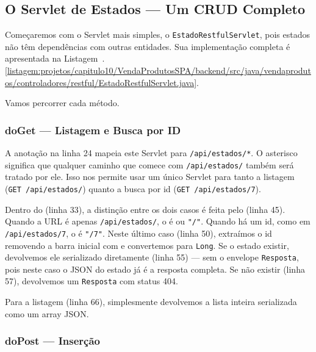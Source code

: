 \subsection{O Servlet de Estados --- Um CRUD Completo}

Começaremos com o Servlet mais simples, o \texttt{EstadoRestfulServlet}, pois estados não têm dependências com outras entidades. Sua implementação completa é apresentada na Listagem~\thechapter.\ref{listagem:projetos/capitulo10/VendaProdutosSPA/backend/src/java/vendaprodutos/controladores/restful/EstadoRestfulServlet.java}.


Vamos percorrer cada método.

\subsubsection{doGet --- Listagem e Busca por ID}

A anotação  na linha 24 mapeia este Servlet para \texttt{/api/estados/*}. O asterisco significa que qualquer caminho que comece com \texttt{/api/estados/} também será tratado por ele. Isso nos permite usar um único Servlet para tanto a listagem (\texttt{GET /api/estados/}) quanto a busca por id (\texttt{GET /api/estados/7}).

Dentro do  (linha 33), a distinção entre os dois casos é feita pelo  (linha 45). Quando a URL é apenas \texttt{/api/estados/}, o  é  ou \texttt{"/"}. Quando há um id, como em \texttt{/api/estados/7}, o  é \texttt{"/7"}. Neste último caso (linha 50), extraímos o id removendo a barra inicial com  e convertemos para \texttt{Long}. Se o estado existir, devolvemos ele serializado diretamente (linha 55) --- sem o envelope \texttt{Resposta}, pois neste caso o JSON do estado já é a resposta completa. Se não existir (linha 57), devolvemos um \texttt{Resposta} com status 404.

Para a listagem (linha 66), simplesmente devolvemos a lista inteira serializada como um array JSON.

\subsubsection{doPost --- Inserção}

